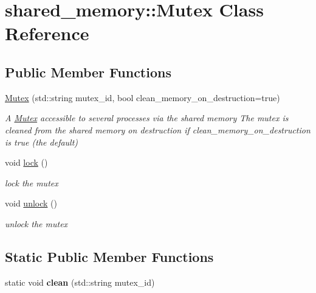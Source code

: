 \hypertarget{classshared__memory_1_1Mutex}{}\section{shared\+\_\+memory\+:\+:Mutex Class Reference}
\label{classshared__memory_1_1Mutex}
\subsection*{Public Member Functions}
\begin{DoxyCompactItemize}
\item 
\mbox{\label{classshared__memory_1_1Mutex_a8f1b1cffa2f3bdfb8cd74cf61b0df650}} 
\hyperlink{classshared__memory_1_1Mutex_a8f1b1cffa2f3bdfb8cd74cf61b0df650}{Mutex} (std\+::string mutex\+\_\+id, bool clean\+\_\+memory\+\_\+on\+\_\+destruction=true)
\begin{DoxyCompactList}\small\item\em A \hyperlink{classshared__memory_1_1Mutex}{Mutex} accessible to several processes via the shared memory The mutex is cleaned from the shared memory on destruction if clean\+\_\+memory\+\_\+on\+\_\+destruction is true (the default) \end{DoxyCompactList}\item 
\mbox{\label{classshared__memory_1_1Mutex_a6b6ca2e15d379a5e3a8d68d15c04469f}} 
void \hyperlink{classshared__memory_1_1Mutex_a6b6ca2e15d379a5e3a8d68d15c04469f}{lock} ()
\begin{DoxyCompactList}\small\item\em lock the mutex \end{DoxyCompactList}\item 
\mbox{\label{classshared__memory_1_1Mutex_a06b9e214880af7ab9703bd78601ac0c6}} 
void \hyperlink{classshared__memory_1_1Mutex_a06b9e214880af7ab9703bd78601ac0c6}{unlock} ()
\begin{DoxyCompactList}\small\item\em unlock the mutex \end{DoxyCompactList}\end{DoxyCompactItemize}
\subsection*{Static Public Member Functions}
\begin{DoxyCompactItemize}
\item 
\mbox{\label{classshared__memory_1_1Mutex_a964e89132bb180569edcf52de5b43978}} 
static void {\bfseries clean} (std\+::string mutex\+\_\+id)
\end{DoxyCompactItemize}
